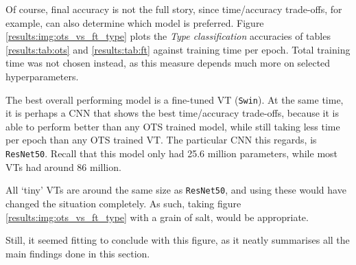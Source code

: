 Of course, final accuracy is not the full story, since time/accuracy trade-offs, for example, can also determine which model is preferred. Figure \ref{results:img:ots_vs_ft_type} plots the \textit{Type classification} accuracies of tables \ref{results:tab:ots} and \ref{results:tab:ft} against training time per epoch. Total training time was not chosen instead, as this measure depends much more on selected hyperparameters.

The best overall performing model is a fine-tuned VT (\texttt{Swin}). At the same time, it is perhaps a CNN that shows the best time/accuracy trade-offs, because it is able to perform better than any OTS trained model, while still taking less time per epoch than any OTS trained VT. The particular CNN this regards, is \texttt{ResNet50}. Recall that this model only had 25.6 million parameters, while most VTs had around 86 million.

All `tiny' VTs are around the same size as \texttt{ResNet50}, and using these would have changed the situation completely. As such, taking figure \ref{results:img:ots_vs_ft_type} with a grain of salt, would be appropriate.

Still, it seemed fitting to conclude with this figure, as it neatly summarises all the main findings done in this section.
